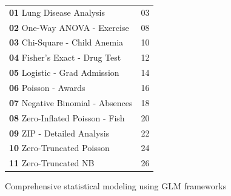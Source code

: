 \documentclass[12pt, a4paper]{article}
\begin{document}
\newpage

\pagestyle{empty}

\begin{center}
    \begin{tcolorbox}[
        colback=white,
        colframe=DeepForest,
        width=0.85\textwidth,
        arc=12pt,
        boxrule=1.2pt,
        left=15pt,
        right=15pt,
        top=15pt,
        bottom=15pt,
        enhanced,
        drop fuzzy shadow,
        title={\centering\color{DeepForest}\large\sffamily\bfseries \faListUl \quad CONTENTS},
        coltitle=DeepForest,
        colbacktitle=white,
        fonttitle=\bfseries,
        titlerule=0pt,
        attach title to upper
    ]
    \vspace{0.5cm}
    \begin{multicols}{2}
    \renewcommand{\arraystretch}{1.6}
    \begin{tabular}{p{} r}
        \textbf{01} \textcolor{DeepForest}{Lung Disease Analysis} & 03 \\
        \textbf{02} \textcolor{DeepForest}{One-Way ANOVA - Exercise} & 08 \\
        \textbf{03} \textcolor{DeepForest}{Chi-Square - Child Anemia} & 10 \\
        \textbf{04} \textcolor{DeepForest}{Fisher's Exact - Drug Test} & 12 \\
        \textbf{05} \textcolor{DeepForest}{Logistic - Grad Admission} & 14 \\
        \textbf{06} \textcolor{DeepForest}{Poisson - Awards} & 16 \\
        \textbf{07} \textcolor{DeepForest}{Negative Binomial - Absences} & 18\\
        \textbf{08} \textcolor{DeepForest}{Zero-Inflated Poisson - Fish} & 20\\
        \textbf{09} \textcolor{DeepForest}{ZIP - Detailed Analysis} & 22\\
        \textbf{10} \textcolor{DeepForest}{Zero-Truncated Poisson} & 24\\
        \textbf{11} \textcolor{DeepForest}{Zero-Truncated NB} & 26\\
    \end{tabular}
    \end{multicols}
    \vspace{0.3cm}
    
    \begin{statbox}
        \centering
        Comprehensive statistical modeling using GLM frameworks
    \end{statbox}
    \end{tcolorbox}
\end{center}
\end{document}
